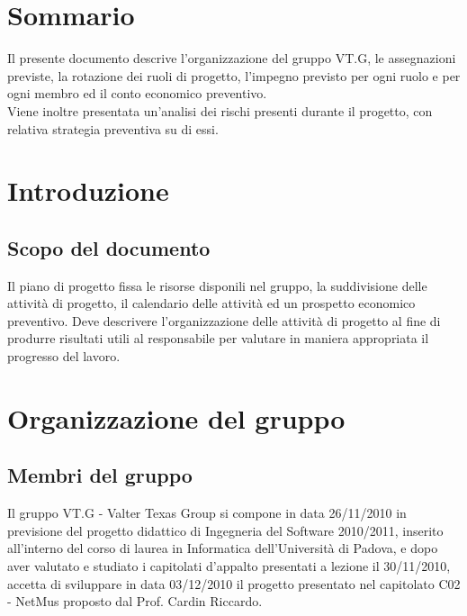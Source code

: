 \tableofcontents
\thispagestyle{fancy} %


\chapter*{Sommario}
Il presente documento descrive l'organizzazione del gruppo VT.G, le
assegnazioni previste, la rotazione dei ruoli di progetto, l'impegno previsto
per ogni ruolo e per ogni membro ed il conto economico preventivo.\\
Viene inoltre presentata un'analisi dei rischi presenti durante il progetto, con relativa strategia preventiva su di essi.


\thispagestyle{fancy} %

\chapter{Introduzione}
\thispagestyle{fancy} %

\section{Scopo del documento}
Il piano di progetto fissa le risorse disponili nel gruppo, la suddivisione
delle attivit\`a di progetto, il calendario delle attivit\`a ed un prospetto
economico preventivo. Deve descrivere l'organizzazione delle attivit\`a di
progetto al fine di produrre risultati utili al responsabile per valutare in
maniera appropriata il progresso del lavoro.




\chapter{Organizzazione del gruppo}
\thispagestyle{fancy}

\section{Membri del gruppo}
Il gruppo VT.G - Valter Texas Group si compone in data 26/11/2010 in previsione
del progetto didattico di Ingegneria del Software 2010/2011, inserito
all'interno del corso di laurea in Informatica dell'Universit\`a di Padova,
e dopo aver valutato e studiato i capitolati d'appalto presentati a lezione il
30/11/2010, accetta di sviluppare in data 03/12/2010 il progetto presentato nel capitolato C02 - NetMus proposto dal Prof. Cardin Riccardo.\\

